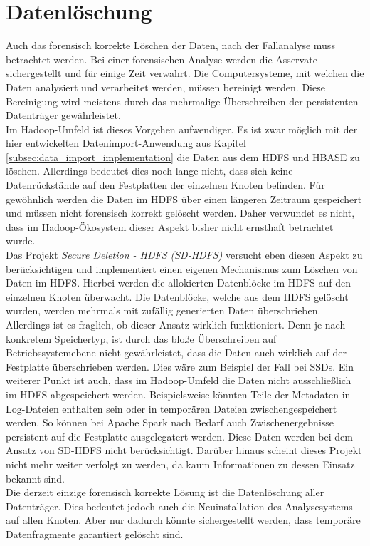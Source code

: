 \section{Datenlöschung}
Auch das forensisch korrekte Löschen der Daten, nach der Fallanalyse muss betrachtet werden. Bei einer forensischen Analyse werden die Asservate sichergestellt und für einige Zeit verwahrt. Die Computersysteme, mit welchen die Daten analysiert und verarbeitet werden, müssen bereinigt werden. Diese Bereinigung wird meistens durch das mehrmalige Überschreiben der persistenten Datenträger gewährleistet.\\ Im Hadoop-Umfeld ist dieses Vorgehen aufwendiger. Es ist zwar möglich mit der hier entwickelten Datenimport-Anwendung aus Kapitel \ref{subsec:data_import_implementation} die Daten aus dem HDFS und HBASE zu löschen. Allerdings bedeutet dies noch lange nicht, dass sich keine Datenrückstände auf den Festplatten der einzelnen Knoten befinden.
Für gewöhnlich werden die Daten im HDFS über einen längeren Zeitraum gespeichert und müssen nicht forensisch korrekt gelöscht werden. Daher verwundet es nicht, dass im Hadoop-Ökosystem dieser Aspekt bisher nicht ernsthaft betrachtet wurde.\\
Das Projekt \textit{Secure Deletion - HDFS (SD-HDFS)} versucht eben diesen Aspekt zu berücksichtigen und implementiert einen eigenen Mechanismus zum Löschen von Daten im HDFS.\cite{sd_hdfs} Hierbei werden die allokierten Datenblöcke im HDFS auf den einzelnen Knoten überwacht. Die Datenblöcke, welche aus dem HDFS gelöscht wurden, werden mehrmals mit zufällig generierten Daten überschrieben. Allerdings ist es fraglich, ob dieser Ansatz wirklich funktioniert. Denn je nach konkretem Speichertyp, ist durch das bloße Überschreiben auf Betriebssystemebene nicht gewährleistet, dass die Daten auch wirklich auf der Festplatte überschrieben werden. Dies wäre zum Beispiel der Fall bei SSDs. Ein weiterer Punkt ist auch, dass im Hadoop-Umfeld die Daten nicht ausschließlich im HDFS abgespeichert werden. Beispielsweise könnten Teile der Metadaten in Log-Dateien enthalten sein oder in temporären Dateien zwischengespeichert werden. So können bei Apache Spark nach Bedarf auch Zwischenergebnisse persistent auf die Festplatte ausgelegatert werden.\cite{spark_rdd} Diese Daten werden bei dem Ansatz von SD-HDFS nicht berücksichtigt. Darüber hinaus scheint dieses Projekt nicht mehr weiter verfolgt zu werden, da kaum Informationen zu dessen Einsatz bekannt sind.\\

\noindent
Die  derzeit einzige forensisch korrekte Lösung ist die Datenlöschung aller Datenträger. Dies bedeutet jedoch auch die Neuinstallation des Analysesystems auf allen Knoten. Aber nur dadurch könnte sichergestellt werden, dass temporäre Datenfragmente garantiert gelöscht sind.  